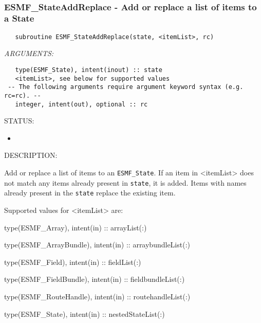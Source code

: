 \mbox{}\hrulefill\ 
 
\subsubsection [ESMF\_StateAddReplace] {ESMF\_StateAddReplace - Add or replace a list of items to a State}


  
\begin{verbatim}   subroutine ESMF_StateAddReplace(state, <itemList>, rc)\end{verbatim}{\em ARGUMENTS:}
\begin{verbatim}   type(ESMF_State), intent(inout) :: state
   <itemList>, see below for supported values
 -- The following arguments require argument keyword syntax (e.g. rc=rc). --
   integer, intent(out), optional :: rc\end{verbatim}
{\sf STATUS:}
   \begin{itemize}
   \item{}
   \end{itemize}
  
{\sf DESCRIPTION:\\ }


   Add or replace a list of items to an {\tt ESMF\_State}. If an item in
   <itemList> does not match any items already present in {\tt state}, it is
   added. Items with names already present in the {\tt state} replace the
   existing item.
  
   Supported values for <itemList> are:
   \begin{description}
   \item type(ESMF\_Array), intent(in) :: arrayList(:)
   \item type(ESMF\_ArrayBundle), intent(in) :: arraybundleList(:)
   \item type(ESMF\_Field), intent(in) :: fieldList(:)
   \item type(ESMF\_FieldBundle), intent(in) :: fieldbundleList(:)
   \item type(ESMF\_RouteHandle), intent(in) :: routehandleList(:)
   \item type(ESMF\_State), intent(in) :: nestedStateList(:)
   \end{description}
  
